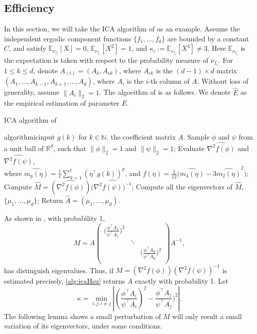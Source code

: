 \documentclass[english]{article} %
\newcommand{\E}{\mathbb{E}}
\newcommand{\real}{\mathbb{R}}
\renewcommand{\natural}{\mathbb{N}}
\theoremstyle{definition}
\begin{document}
\subsection{Efficiency}
In this section, we will take the ICA algorithm of \citet{DHsu2012} as an example. 
Assume the independent ergodic component functions $\{f_1,\ldots,f_d\}$ are bounded by a constant $C$, and satisfy $\E_{\nu_{f_i}}[X]=0$, $\E_{\nu_{f_i}}[X^2]=1$, and $\kappa_i := \E_{\nu_{f_i}}[X^4]\neq 3$. 
Here $\E_{\nu_{f_i}}$ is the expectation is taken with respect to the probability measure of $\nu_{f_i}$. 
For $1\le k\le d$, denote $A_{(t)} = (A_k,A_{ck})$, where $A_{ck}$ is the $(d-1)\times d$ matrix $(A_1,\ldots,A_{k-1},A_{k+1},\ldots,A_d)$, where $A_i$ is the $i$-th column of $A$. 
Without loss of generality, assume $\|A_i\|_2=1$.
The algoeithm of \citet{DHsu2012} is as follows. We denote $\widehat{E}$ as the empirical estimation of parameter $E$. 
\begin{algorithm}[H]
\caption{ICA algorithm of \citet{DHsu2012} \label{alg:icaHsu}}
\begin{algorithmic}[1]
\INPUT algorithmicinput $g(k)$ for $k\in\natural$.
\OUTPUT the coefficient matrix $A$. 
\STATE Sample $\phi$ and $\psi$ from a unit ball of $\real^d$, such that $\|\phi\|_2 = 1$ and $\|\psi\|_2 = 1$;
\STATE Evaluate $\widehat{\nabla^2f(\phi)}$ and $\widehat{\nabla^2f(\psi)}$, \\
\quad where $\widehat{m_p(\eta)} = \frac{1}{t}\sum_{k=1}^{t} (\eta^{\top}g(k))^p$, and $f(\eta) = \frac{1}{12}\big(\widehat{m_4(\eta)} - 3\widehat{m_2(\eta)}^2 \big)$;
\STATE Compute $\widehat{M} = (\widehat{\nabla^2f(\phi)})(\widehat{\nabla^2f(\psi))^{-1}}$;
\STATE Compute all the eigenvectors of $\widehat{M}$, $\{\mu_1,\ldots,\mu_d\}$;
\STATE Return $\widehat{A} = (\mu_1,\ldots,\mu_d)$.
\end{algorithmic}
\end{algorithm}

As shown in \citep{DHsu2012}, with probability 1,
\begin{equation}
\label{eq:M}
M = A 
\left(
\begin{array}{ccc}
\big(\frac{\phi^{\top}A_1}{\psi^{\top}A_1}\big)^2 & &\\
    & \ddots & \\
    & & \big(\frac{\phi^{\top}A_d}{\psi^{\top}A_d}\big)^2\\
\end{array} 
\right) 
A^{-1},
\end{equation}
has distinguish eigenvalues. Thus, if $M =(\nabla^2f(\phi))(\nabla^2f(\psi))^{-1} $ is estimated precisely, \cref{alg:icaHsu} returns $A$ exactly  with probability 1. 
Let 
\begin{equation}
\label{def:kappa}
\kappa =  \min_{i,j: i\neq j} \left\vert (\frac{\phi^{\top}A_i}{\psi^{\top}A_i})^2 - \frac{\phi^{\top}A_j}{\psi^{\top}A_j})^2 \right\vert. 
\end{equation}
The following lemma shows a small perturbation of $M$ will only result a small variation of its eigenvectors, under some conditions.
\end{document}
